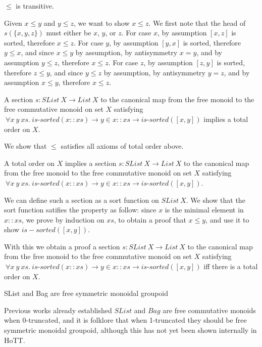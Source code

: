 \documentclass{article}
\begin{document}
\begin{mythm}
    $\leq$ is transitive.
\end{mythm}
Given $x \leq y$ and $y \leq z$, we want to show $x \leq z$. We first note that the head of $s(\{x,y,z\})$
must either be $x$, $y$, or $z$.
For case $x$, by assumption $[x, z]$ is sorted, therefore $x \leq z$.
For case $y$, by assumption $[y, x]$ is sorted, therefore $y \leq x$, and since $x \leq y$ by assumption,
by antisymmetry $x = y$, and by assumption $y \leq z$, therefore $x \leq z$.
For case $z$, by assumption $[z, y]$ is sorted, therefore $z \leq y$, and since $y \leq z$ by assumption,
by antisymmetry $y = z$, and by assumption $x \leq y$, therefore $x \leq z$.

\begin{mythm}
    A section $s : SList \: X \rightarrow List \: X$ to the canonical map from the free monoid to the free commutative monoid on set $X$
    satisfying
    $\: \forall x \: y \: xs. \: \textit{is-sorted}(x :: xs) \rightarrow y \in x :: xs \rightarrow \textit{is-sorted}([x, y])$
    implies a total order on $X$.
\end{mythm}
    We show that $\leq$ satisfies all axioms of total order above.

\begin{mythm}
    A total order on $X$ implies
    a section $s : SList \: X \rightarrow List \: X$ to the canonical map from the free monoid to the free commutative monoid on set $X$
    satisfying
    $\: \forall x \: y \: xs. \: \textit{is-sorted}(x :: xs) \rightarrow y \in x :: xs \rightarrow \textit{is-sorted}([x, y])$.
\end{mythm}
    We can define such a section as a sort function on $SList \: X$.
    We show that the sort function satifies the property
    as follow: since $x$ is the minimal element in $x :: xs$, we prove by induction on $xs$,
    to obtain a proof that $x \leq y$, and use it to show $is-sorted([x, y])$.

    With this we obtain a proof
    a section $s : SList \: X \rightarrow List \: X$ to the canonical map from the free monoid to the free commutative monoid on set $X$
    satisfying
    $\: \forall x \: y \: xs. \: \textit{is-sorted}(x :: xs) \rightarrow y \in x :: xs \rightarrow \textit{is-sorted}([x, y])$
    iff there is a total order on $X$.


\begin{myconj}
    SList and Bag are free symmetric monoidal groupoid
\end{myconj}
Previous works already established $SList$ and $Bag$ are free commutative
monoids when 0-truncated, and it is folklore that when 1-truncated they should be free symmetric monoidal groupoid, although
this has not yet been shown internally in HoTT.
\end{document}
